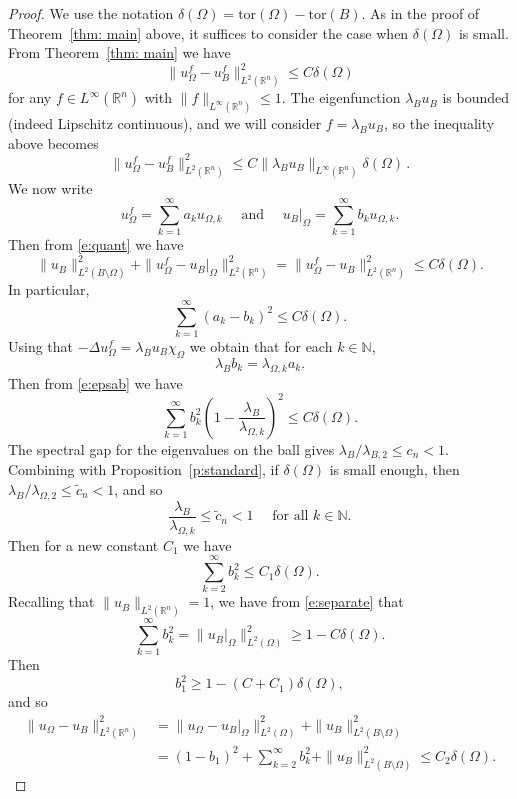 \documentclass[10pt, reqno]{amsart}
\numberwithin{equation}{section}
\def\R{{\mathbb R}}
\def\W{\Omega}
\def\tor{\mathrm{tor}}
\begin{document}
\begin{proof}
We use the notation $\delta(\W)=\tor(\W)-\tor(B)$. 
As in the proof of Theorem~\ref{thm: main} above, it suffices to consider the case when $\delta(\W)$ is small.
From Theorem~\ref{thm: main} we have 
\[
 \| u_{\W}^f - u_{B}^f \|^2_{L^2(\mathbb{R}^n)} \leq C \delta(\W)
\]
 for any $f \in {L^\infty}(\R^n)$ with $\| f\|_{{L^\infty}(\R^n)} \leq 1.$
The eigenfunction $\lambda_B u_B$ is {bounded} (indeed Lipschitz continuous), and we will consider $f=\lambda_B u_{B}$, so the inequality above becomes 
\begin{equation} \label{e:quant}
 \| u_{\W}^f - u_{B}^f \|^2_{L^2(\mathbb{R}^n)} \leq C \|\lambda_B u_B \|_{L^{\infty}(\mathbb{R}^n)} \delta(\W)\,.
\end{equation}
We now write 
\[
u_{\W}^f = \sum_{k=1}^{\infty} a_k u_{\W,k}
\quad \text{ and } \quad  
u_{B}\big|_{\W} = \sum_{k=1}^{\infty} b_k u_{\W,k}. 
\]
Then from \eqref{e:quant} we have 
\begin{equation} \label{e:separate}
  \|u_B \|^2_{L^2(B \setminus \W)} +  \| u_{\W}^f - u_{B}\big|_{\W} \|^2_{L^2(\mathbb{R}^n)} =   \| u_{\W}^f - u_{B} \|^2_{L^2(\mathbb{R}^n)} \leq C \delta(\W). 
\end{equation}
 In particular, 
\begin{equation} \label{e:epsab}
    \sum_{k=1}^{\infty} (a_k - b_k)^2 \leq C \delta(\W). 
\end{equation}
Using that $-\Delta u_{\W}^f = \lambda_B u_B \chi_{\W}$ we obtain that for each $k \in \mathbb{N}$,
\[
\lambda_B b_k = \lambda_{\W,k} a_k.  
\]
Then from \eqref{e:epsab} we have 
\[
\sum_{k=1}^{\infty} b_k^2 \left(1- \frac{\lambda_B}{\lambda_{\W,k}} \right)^2 \leq C \delta(\W). 
\]
The spectral gap for the eigenvalues on the ball gives $\lambda_{B}/\lambda_{B,2} \leq c_n <1$. Combining with Proposition~\ref{p:standard}, if $\delta(\W)$ is small enough, then 
$\lambda_{B}/\lambda_{\Omega,2} \leq \tilde{c}_n <1$, and so 
\[
  \frac{\lambda_{B}}{\lambda_{\Omega,k}} \leq \tilde{c}_n <1 \quad \text{ for all } k \in \mathbb{N}. 
\]
Then for a new constant $C_1$ we have 
\[
\sum_{k=2}^{\infty} b_k^2 \leq C_1 \delta(\W). 
\]
Recalling that $\|u_B\|_{L^2(\mathbb{R}^n)}=1$, we have from \eqref{e:separate} that
\[
\sum_{k=1}^{\infty} b_k^2 = \| u_B \big|_\W \|^2_{L^2(\W)} \geq 1 - C\delta(\W). 
\]
Then 
\[
b_1^2 \geq 1 - (C+C_1) \delta(\W),
\]
and so 
\[
\begin{aligned}
\| u_{\W} - u_B \|_{L^2(\mathbb{R}^n)}^2 
&=\| u_{\W} - u_B \big|_{\W} \|_{L^2(\W)}^2 + \|u_B \|^2_{L^2(B \setminus \W)} \\
&=(1-b_1)^2 + \sum_{k=2}^{\infty} b_k^2 + \|u_B \|^2_{L^2(B \setminus \W)} \leq C_2 \delta(\W). 
\end{aligned}
\]
\end{proof}
\end{document}

